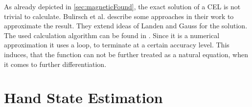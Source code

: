 As already depicted in \ref{sec:magneticFound}, the exact solution of a \ac{CEL} is not trivial to calculate. Bulirsch et al. \cite{bulirsch1965numerical} describe some approaches in their work to approximate the result. They extend ideas of Landen and Gauss for the solution. The used calculation algorithm can be found in \cite{derby2010cylindrical}. Since it is a numerical approximation it uses a loop, to terminate at a certain accuracy level. This induces, that the function can not be further treated as a natural equation, when it comes to further differentiation.



\section{Hand State Estimation} \label{sec:estimation}

